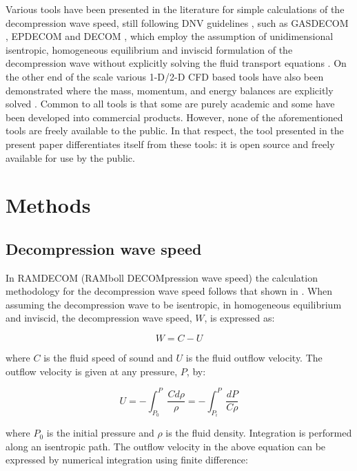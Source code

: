 \documentclass[a4paper, 10pt, twocolumn, twoside]{scrartcl}
\begin{document}
Various tools have been presented in the literature for simple calculations of the decompression wave speed, still following DNV guidelines \cite{dnv}, such as GASDECOM \cite{Cosham_GASDECOM}, EPDECOM \cite{Lu2012_EPDECOM} and DECOM \cite{Cosham_DECOM}, which employ the assumption of unidimensional isentropic, homogeneous equilibrium and inviscid formulation of the decompression wave without explicitly
solving the fluid transport equations \cite{Liu_2017}. On the other end of the scale  various 1-D/2-D CFD based tools have also been demonstrated where the mass, momentum, and energy balances are explicitly solved \cite{Xu2014_CFDDECOM,OKE20034591_pipetech_CFD,ELSHAHOMI201520_CFD,Fang2019}. Common to all tools is that some are purely academic and some have been developed into commercial products. However, none of the aforementioned tools are freely available to the public. In that respect, the tool presented in the present paper differentiates itself from these tools: it is open source and freely available for use by the public. 

\section{Methods}

\subsection{Decompression wave speed}
In RAMDECOM (RAMboll DECOMpression wave speed) the calculation methodology for the decompression wave speed follows that shown in \cite{GU2018237,Hu2021}. When assuming the decompression wave to be isentropic, in  homogeneous equilibrium and inviscid, the decompression wave speed, $W$, is expressed as:

\begin{equation}\label{eqn:decompression}
W = C - U 
\end{equation}

where $C$ is the fluid speed of sound and $U$ is the fluid outflow velocity. The outflow velocity is given at any pressure, $P$, by:

\begin{equation}\label{eqn:outflow}
U = -\int_{P_0}^{P}{\frac{Cd\rho}{\rho}} = -\int_{P_i}^{P}{\frac{dP}{C\rho}}
\end{equation}

where $P_0$ is the initial pressure and $\rho$ is the fluid density. Integration is performed along an isentropic path. The outflow velocity in the above equation can be expressed by numerical integration using finite difference:
\end{document}
